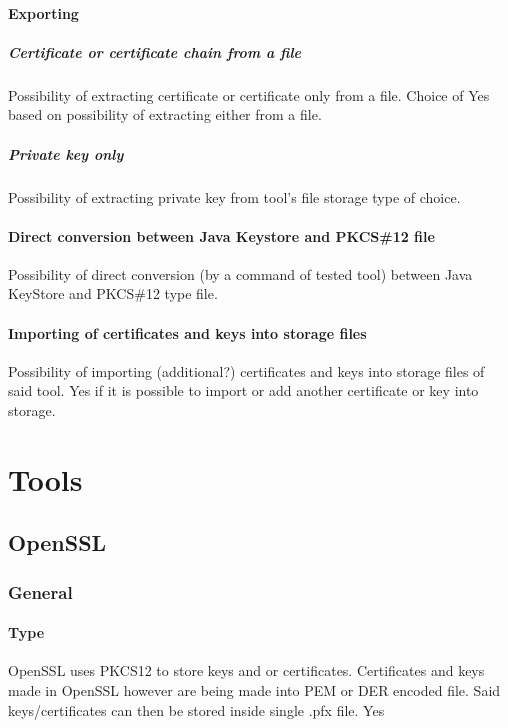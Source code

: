 \documentclass[10pt, a4paper]{report}
\begin{document}
\subsection{Exporting}

\subsubsection{Certificate or certificate chain from a file}
Possibility of extracting certificate or certificate only from a file. Choice of Yes based on possibility of extracting either from a file.

\subsubsection{Private key only}
Possibility of extracting private key from tool's file storage type of choice.

\subsection{Direct conversion between Java Keystore and PKCS\#12 file}
Possibility of direct conversion (by a command of tested tool) between Java KeyStore and PKCS\#12 type file.

\subsection{Importing of certificates and keys into storage files}
Possibility of importing (additional?) certificates and keys into storage files of said tool. Yes if it is possible to import or add another certificate or key into storage.


\newpage
\part{Tools}

\chapter{OpenSSL}

\section{General}

  \subsection{Type}
  OpenSSL uses PKCS12 to store keys and or certificates. Certificates and keys  made in OpenSSL however are being made into PEM or DER encoded file. Said keys/certificates can then be stored inside single .pfx file. 
  Yes             
\end{document}
